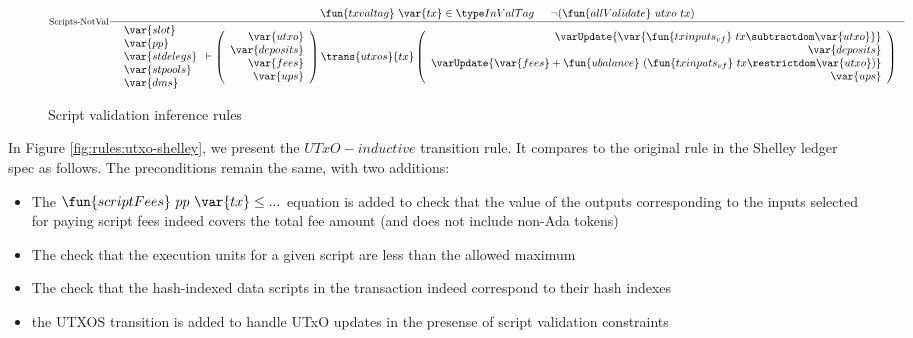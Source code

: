 \begin{figure}[htb]
\begin{equation}
{    }
  \end{equation}
  \begin{equation}
    \inference[Scripts-NotVal]
    {
    \fun{txvaltag}~\var{tx} \in \InValTag &
    \neg (\fun{allValidate}~{utxo}~{tx} ) \\
    }
    {
    \begin{array}{l}
      \var{slot}\\
      \var{pp}\\
      \var{stdelegs}\\
      \var{stpools}\\
      \var{dms}\\
    \end{array}
      \vdash
      \left(
      \begin{array}{r}
        \var{utxo} \\
        \var{deposits} \\
        \var{fees} \\
        \var{ups} \\
      \end{array}
      \right)
      \trans{utxos}{tx}
      \left(
      \begin{array}{r}
        \varUpdate{\var{\fun{txinputs_{vf}}~{tx} \subtractdom \var{utxo}}}  \\
        \var{deposits} \\
        \varUpdate{\var{fees} + \fun{ubalance}~(\fun{txinputs_{vf}}~{tx}\restrictdom \var{utxo})} \\
        \var{ups} \\
      \end{array}
      \right)
    }
  \end{equation}
  \caption{Script validation inference rules}
  \label{fig:rules:utxo-scrval}
\end{figure}

In Figure \ref{fig:rules:utxo-shelley}, we present the ${UTxO-inductive}$
transition rule. It compares to the original rule in the Shelley ledger spec
as follows. The preconditions remain the same, with two additions:

\begin{itemize}
  \item The $\fun{scriptFees}~{pp}~\var{tx} \leq ...$ equation is added to check
  that the value of the outputs corresponding to the inputs selected
  for paying script fees indeed covers the total fee amount (and does not
  include non-Ada tokens)

  \item The check that the execution units for a given script are less than
  the allowed maximum

  \item The check that the hash-indexed data scripts in the
  transaction indeed correspond to their hash indexes

  \item the UTXOS transition is added to handle UTxO updates in the presense
  of script validation constraints
\end{itemize}

